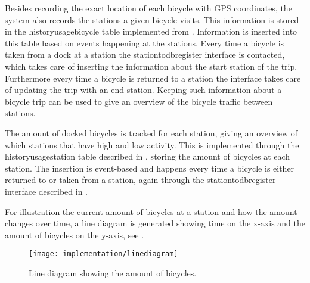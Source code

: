 Besides recording the exact location of each bicycle with GPS coordinates, the system also records the stations a given bicycle visits.
This information is stored in the historyusagebicycle table implemented from .
Information is inserted into this table based on events happening at the stations. 
Every time a bicycle is taken from a dock at a station the stationtodbregister interface is contacted, which takes care of inserting the information about the start station of the trip.
Furthermore every time a bicycle is returned to a station the interface takes care of updating the trip with an end station.
Keeping such information about a bicycle trip can be used to give an overview of the bicycle traffic between stations.

The amount of docked bicycles is tracked for each station, giving an overview of which stations that have high and low activity.
This is implemented through the historyusagestation table described in , storing the amount of bicycles at each station.
The insertion is event-based and happens every time a bicycle is either returned to or taken from a station, again through the stationtodbregister interface described in .

For illustration the current amount of bicycles at a station and how the amount changes over time, a line diagram is generated showing time on the x-axis and the amount of bicycles on the y-axis, see .
\begin{figure}[h]
\texttt{[image: implementation/linediagram]}
\caption{Line diagram showing the amount of bicycles.}\label{fig:linediagram}
\end{figure}

